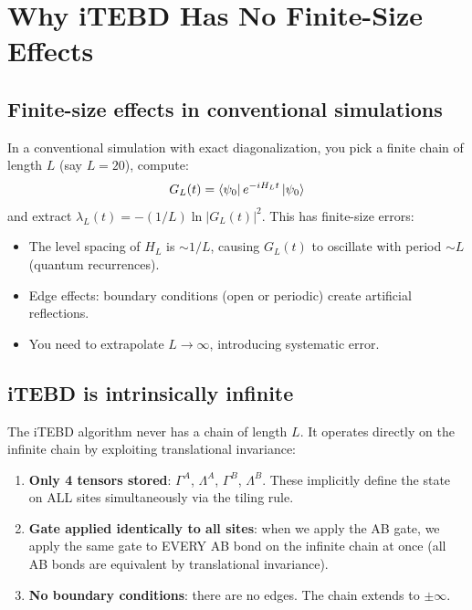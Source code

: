\documentclass[11pt, a4paper]{article}
\begin{document}
\section{Why iTEBD Has No Finite-Size Effects}
\label{sec:no_finite_size}

\subsection{Finite-size effects in conventional simulations}

In a conventional simulation with exact diagonalization, you pick a finite chain of length $L$ (say $L = 20$), compute:
\begin{equation}
  G_L(t) = \bra{\psi_0}e^{-iH_L t}\ket{\psi_0}
\end{equation}
and extract $\lambda_L(t) = -(1/L)\ln|G_L(t)|^2$. This has finite-size errors:
\begin{itemize}
  \item The level spacing of $H_L$ is $\sim 1/L$, causing $G_L(t)$ to oscillate with period $\sim L$ (quantum recurrences).
  \item Edge effects: boundary conditions (open or periodic) create artificial reflections.
  \item You need to extrapolate $L \to \infty$, introducing systematic error.
\end{itemize}

\subsection{iTEBD is intrinsically infinite}

The iTEBD algorithm never has a chain of length $L$. It operates directly on the infinite chain by exploiting translational invariance:

\begin{enumerate}
  \item \textbf{Only 4 tensors stored}: $\Gamma^A$, $\Lambda^A$, $\Gamma^B$, $\Lambda^B$. These implicitly define the state on ALL sites simultaneously via the tiling rule.
  \item \textbf{Gate applied identically to all sites}: when we apply the AB gate, we apply the same gate to EVERY AB bond on the infinite chain at once (all AB bonds are equivalent by translational invariance).
  \item \textbf{No boundary conditions}: there are no edges. The chain extends to $\pm\infty$.
\end{enumerate}
\end{document}
